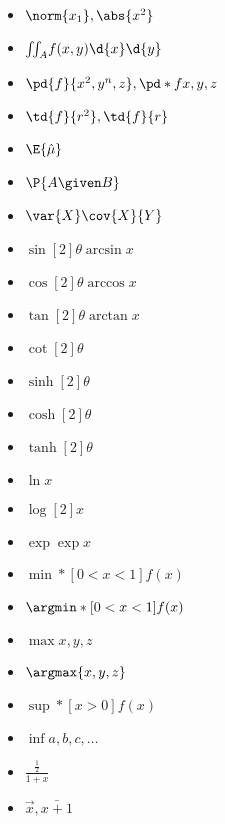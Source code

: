 \documentclass{minimal}
\begin{document}
	\begin{itemize}
		\item \(\norm{x_1}, \abs{x^2}\)
		\item \(\iint_A\! f(x,y) \d{x}\d{y}\)
		\item \(\pd{f}{x^2,y^n,z}, \pd*{f}{x,y,z}\)
		\item \(\td{f}{r^2}, \td{f}{r}\)
		\item \(\E{\hat{\mu}}\)
		\item \(\P{A\given B}\)
		\item \(\var{X}\cov{X}{Y}\)
		\item \(\sin[2]{\theta}\arcsin{x}\)
		\item \(\cos[2]{\theta}\arccos{x}\)
		\item \(\tan[2]{\theta}\arctan{x}\)
		\item \(\cot[2]{\theta}\)
		\item \(\sinh[2]{\theta}\)
		\item \(\cosh[2]{\theta}\)
		\item \(\tanh[2]{\theta}\)
		\item \(\ln{x}\)
		\item \(\log[2]{x}\)
		\item \(\exp{\exp{x}}\)
		\item \(\min*[0<x<1]{f(x)}\)
		\item \(\argmin*[0<x<1]{f(x)}\)
		\item \(\max{x,y,z}\)
		\item \(\argmax{x,y,z}\)
		\item \(\sup*[x>0]{f(x)}\)
		\item \(\inf{a,b,c,\dotsc}\)
		\item \(\frac{\frac{1}{2}}{1+x}\)
		\item \(\vec{x}, \bar{x+1}\)
	\end{itemize}
\end{document}
